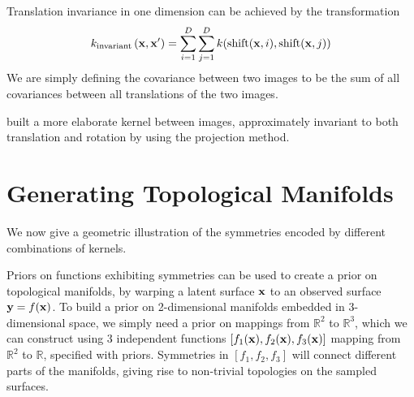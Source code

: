 Translation invariance in one dimension can be achieved by the transformation
%
\begin{align}
k_\textnormal{invariant} \left( \vx, \vx' \right) = %
\sum_{i=1}^D \sum_{j=1}^D k( \shift(\vx, i), \shift(\vx, j) )
\end{align}
%
We are simply defining the covariance between two images to be the sum of all covariances between all translations of the two images.

\citet{kondor2008group} built a more elaborate kernel between images, approximately invariant to both translation and rotation by using the projection method.







\section{Generating Topological Manifolds}
\label{sec:topological-manifolds}

We now give a geometric illustration of the symmetries encoded by different combinations of kernels.

Priors on functions exhibiting symmetries can be used to create a prior on topological manifolds, by warping a latent surface ${\bf{x}}$ to an observed surface ${\bf{y}} = f({\bf{x}})$.
To build a prior on 2-dimensional manifolds embedded in 3-dimensional space, we simply need a prior on mappings from $\mathbb{R}^2$ to $\mathbb{R}^3$, which we can construct using 3 independent functions $[f_1({\bf{x}}), f_2({\bf{x}}), f_3({\bf{x}})]$ mapping from $\mathbb{R}^2$ to $\mathbb{R}$, specified with \gp{} priors.
Symmetries in $[f_1, f_2, f_3]$ will connect different parts of the manifolds, giving rise to non-trivial topologies on the sampled surfaces.


